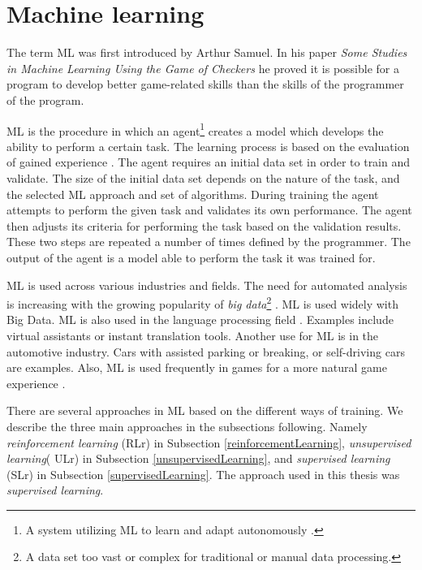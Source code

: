 \section{Machine learning} \label{machineLearning}
The term ML was first introduced by Arthur Samuel. In his paper \textit{Some Studies in Machine Learning Using the Game of Checkers} \cite{machineLearningOriginal} he proved it is possible for a program to develop better game-related skills than the skills of the programmer of the program.

ML is the procedure in which an agent\footnote{A system utilizing ML to learn and adapt autonomously \cite{machineLeraningApproaches}.} creates a model which develops the ability to perform a certain task. The learning process is based on the evaluation of gained experience \cite{machineLearningToday}. The agent requires an initial data set in order to train and validate. The size of the initial data set depends on the nature of the task, and the selected ML approach and set of algorithms. During training the agent attempts to perform the given task and validates its own performance. The agent then adjusts its criteria for performing the task based on the validation results. These two steps are repeated a number of times defined by the programmer. The output of the agent is a model able to perform the task it was trained for. 

ML is used across various industries and fields. The need for automated analysis is increasing with the growing popularity of \textit{big data}\footnote{A data set too vast or complex for traditional or manual data processing.} \cite{bigDataExplained} \cite{bigDataPopularity}. ML is used widely with Big Data. ML is also used in the language processing field \cite{machineLearningToday}. Examples include virtual assistants or instant translation tools. Another use for ML is in the automotive industry. Cars with assisted parking or breaking, or self-driving cars are examples\cite{selfDrivingCars}. Also, ML is used frequently in games for a more natural game experience \cite{machineLearningGaming}. 

There are several approaches in ML based on the different ways of training. We describe the three main approaches in the subsections following. Namely \textit{reinforcement learning} (RLr) in Subsection \ref{reinforcementLearning}, \textit{unsupervised learning}( ULr) in Subsection \ref{unsupervisedLearning}, and \textit{supervised learning} (SLr) in Subsection \ref{supervisedLearning}. The approach used in this thesis was \textit{supervised learning}. 


